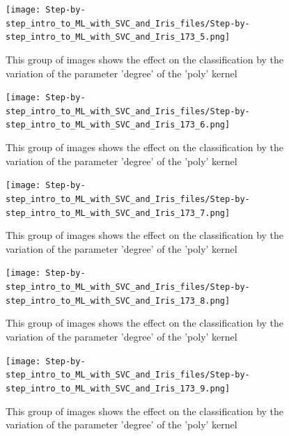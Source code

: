 \documentclass [oneside,10pt,a4paper,ngerman,BCOR10mm,headsepline,parindent,final]{scrartcl}
\begin{document}
    \begin{figure}
        \begin{center}\texttt{[image: Step-by-step\_intro\_to\_ML\_with\_SVC\_and\_Iris\_files/Step-by-step\_intro\_to\_ML\_with\_SVC\_and\_Iris\_173\_5.png]}\end{center}
        \caption{This group of images shows the effect on the classification by the variation of the parameter 'degree' of the 'poly' kernel}
        \label{fig:vary_degree_parameter}
    \end{figure}
    
    \begin{figure}
        \begin{center}\texttt{[image: Step-by-step\_intro\_to\_ML\_with\_SVC\_and\_Iris\_files/Step-by-step\_intro\_to\_ML\_with\_SVC\_and\_Iris\_173\_6.png]}\end{center}
        \caption{This group of images shows the effect on the classification by the variation of the parameter 'degree' of the 'poly' kernel}
        \label{fig:vary_degree_parameter}
    \end{figure}
    
    \begin{figure}
        \begin{center}\texttt{[image: Step-by-step\_intro\_to\_ML\_with\_SVC\_and\_Iris\_files/Step-by-step\_intro\_to\_ML\_with\_SVC\_and\_Iris\_173\_7.png]}\end{center}
        \caption{This group of images shows the effect on the classification by the variation of the parameter 'degree' of the 'poly' kernel}
        \label{fig:vary_degree_parameter}
    \end{figure}
    
    \begin{figure}
        \begin{center}\texttt{[image: Step-by-step\_intro\_to\_ML\_with\_SVC\_and\_Iris\_files/Step-by-step\_intro\_to\_ML\_with\_SVC\_and\_Iris\_173\_8.png]}\end{center}
        \caption{This group of images shows the effect on the classification by the variation of the parameter 'degree' of the 'poly' kernel}
        \label{fig:vary_degree_parameter}
    \end{figure}
    
    \begin{figure}
        \begin{center}\texttt{[image: Step-by-step\_intro\_to\_ML\_with\_SVC\_and\_Iris\_files/Step-by-step\_intro\_to\_ML\_with\_SVC\_and\_Iris\_173\_9.png]}\end{center}
        \caption{This group of images shows the effect on the classification by the variation of the parameter 'degree' of the 'poly' kernel}
        \label{fig:vary_degree_parameter}
    \end{figure}
    
\end{document}
